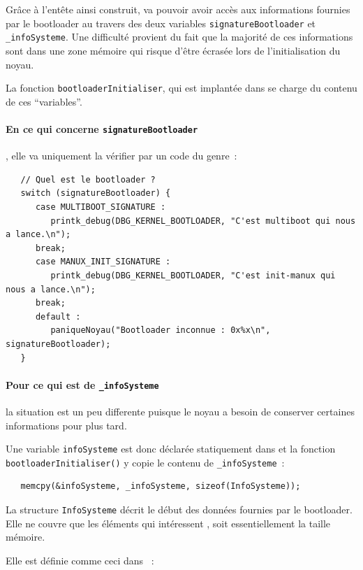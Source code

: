    Grâce à l'entête ainsi construit, \manux va pouvoir avoir accès aux
informations fournies par le bootloader au travers des deux variables
\lstinline!signatureBootloader! et \lstinline!_infoSysteme!. Une
difficulté provient du fait que la majorité de ces informations sont
dans une zone mémoire qui risque d'être écrasée lors de
l'initialisation du noyau. 

   La fonction \lstinline!bootloaderInitialiser!, qui est implantée dans
 se charge du  contenu de ces
``variables''.

   \paragraph{En ce qui concerne \lstinline!signatureBootloader!}, elle va
uniquement la vérifier par un code du genre~:

\begin{lstlisting}
   // Quel est le bootloader ?
   switch (signatureBootloader) {
      case MULTIBOOT_SIGNATURE :
         printk_debug(DBG_KERNEL_BOOTLOADER, "C'est multiboot qui nous a lance.\n");
      break;
      case MANUX_INIT_SIGNATURE :
         printk_debug(DBG_KERNEL_BOOTLOADER, "C'est init-manux qui nous a lance.\n");
      break;
      default :
         paniqueNoyau("Bootloader inconnue : 0x%x\n", signatureBootloader);
   }  
\end{lstlisting}

\paragraph{Pour ce qui est de \lstinline!_infoSysteme!} la situation
est un peu differente puisque le noyau a besoin de conserver certaines
informations pour plus tard.

   Une variable \lstinline!infoSysteme! est donc déclarée statiquement
dans  et la fonction
\lstinline!bootloaderInitialiser()! y copie le contenu de
\lstinline!_infoSysteme!~:

\begin{lstlisting}
   memcpy(&infoSysteme, _infoSysteme, sizeof(InfoSysteme));
\end{lstlisting}

   La structure \lstinline!InfoSysteme! décrit le début des données
fournies par le bootloader. Elle ne couvre que les éléments qui
intéressent \manux, soit essentiellement la taille mémoire.

   Elle est définie comme ceci dans
   ~:

